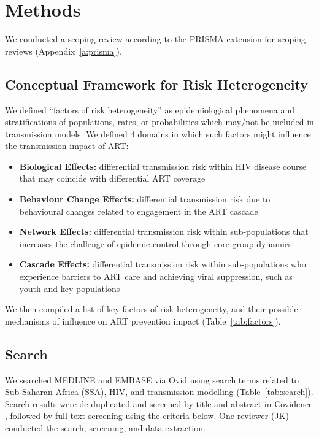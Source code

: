 \section{Methods}
\label{s:meth}
We conducted a scoping review according to the PRISMA extension for scoping reviews
(Appendix~\ref{a:prisma}).
\subsection{Conceptual Framework for Risk Heterogeneity}
\label{ss:meth:framework}
We defined ``factors of risk heterogeneity'' as
epidemiological phenomena and stratifications of populations, rates, or probabilities
which may/not be included in transmission models.
We defined 4 domains in which such factors might influence the transmission impact of ART:
\begin{itemize}
  \item \textbf{Biological Effects:}
  differential transmission risk within HIV disease course
  that may coincide with differential ART coverage
  \cite{Pilcher2004}
  \item \textbf{Behaviour Change Effects:}
  differential transmission risk due to
  behavioural changes related to engagement in the ART cascade
  \cite{Ramachandran2016,Tiwari2020}
  \item \textbf{Network Effects:}
  differential transmission risk within sub-populations
  that increases the challenge of epidemic control through core group dynamics
  \cite{Boily1997,Watts2010,Dodd2010}
  \item \textbf{Cascade Effects:}
  differential transmission risk within sub-populations
  who experience barriers to ART care and achieving viral suppression,
  such as youth and key populations
  \cite{Mountain2014,Lancaster2016,Hakim2018,Green2020}
\end{itemize}
We then compiled a list of key factors of risk heterogeneity,
and their possible mechanisms of influence on ART prevention impact (Table~\ref{tab:factors}).
\begin{sidewaystable}
  \caption{%
    Factors of heterogeneity in HIV transmission
    and their possible mechanisms of influence on the prevention impact of ART interventions}
  
  \label{tab:factors}
\end{sidewaystable}
\subsection{Search}
\label{ss:meth:search}
We searched MEDLINE and EMBASE via Ovid
using search terms related to Sub-Saharan Africa (SSA), HIV, and transmission modelling
(Table~\ref{tab:search}).
Search results were de-duplicated and screened by title and abstract in Covidence \cite{Covidence},
followed by full-text screening using the criteria below.
One reviewer (JK) conducted the search, screening, and data extraction.
